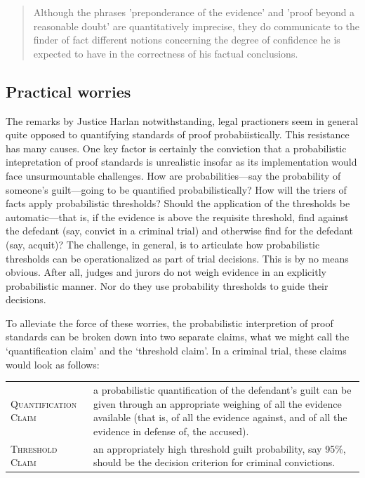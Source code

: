 \documentclass[10pt,dvipsnames,enabledeprecatedfontcommands]{scrartcl}
\begin{document}
\begin{quote}
Although the phrases 'preponderance of the evidence' and 'proof beyond a reasonable doubt' are quantitatively imprecise, they do communicate to the finder of fact different notions concerning the degree of confidence he is expected to have in the correctness of his factual conclusions.
\end{quote}


\hypertarget{practical-worries}{%
\subsection{Practical worries}\label{practical-worries}}

The remarks by Justice Harlan notwithstanding, legal practioners seem in
general quite opposed to quantifying standards of proof
probabiistically. This resistance has many causes. One key factor is
certainly the conviction that a probabilistic intepretation of proof
standards is unrealistic insofar as its implementation would face
unsurmountable challenges. How are probabilities---say the probability
of someone's guilt---going to be quantified probabilistically? How will
the triers of facts apply probabilistic thresholds? Should the
application of the thresholds be automatic---that is, if the evidence is
above the requisite threshold, find against the defedant (say, convict
in a criminal trial) and otherwise find for the defedant (say, acquit)?
The challenge, in general, is to articulate how probabilistic thresholds
can be operationalized as part of trial decisions. This is by no means
obvious. After all, judges and jurors do not weigh evidence in an
explicitly probabilistic manner. Nor do they use probability thresholds
to guide their decisions.

To alleviate the force of these worries, the probabilistic interpretion
of proof standards can be broken down into two separate claims, what we
might call the `quantification claim' and the `threshold claim'. In a
criminal trial, these claims would look as follows:

\begin{tabular}{lp{8.5cm}}
 \textsc{Quantification Claim} & a probabilistic quantification of the defendant's guilt can 
 be given through an appropriate weighing of all the evidence available (that is, of all the evidence against, and of all the evidence in defense of, the accused).\\
 \textsc{Threshold Claim} & an appropriately high threshold guilt probability, say 95\%, 
 should be the decision criterion for criminal convictions.
  \end{tabular}
\end{document}
